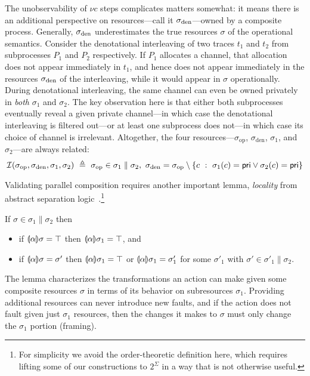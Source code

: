 \documentclass{entcs}
\begin{document}
The unobservability of $\nu c$ steps complicates matters somewhat: it
means there is an additional perspective on resources---call it
$\sigma_{\rm den}$---owned by a composite process.  Generally,
$\sigma_{\rm den}$ underestimates the true resources $\sigma$ of the
operational semantics.  Consider the denotational interleaving of two
traces $t_1$ and $t_2$ from subprocesses $P_1$ and $P_2$ respectively.
If $P_1$ allocates a channel, that allocation does not appear
immediately in $t_1$, and hence does not appear immediately in the
resources $\sigma_{\rm den}$ of the interleaving, while it would
appear in $\sigma$ operationally.  During denotational interleaving,
the same channel can even be owned privately in \emph{both} $\sigma_1$
and $\sigma_2$.  The key observation here is that either both
subprocesses eventually reveal a given private channel---in which case
the denotational interleaving is filtered out---or at least one
subprocess does not---in which case its choice of channel is
irrelevant.  Altogether, the four resources---$\sigma_{\textrm{op}}$,
$\sigma_{\textrm{den}}$, $\sigma_1$, and $\sigma_2$---are always
related: 
\[
\CI(\sigma_{\textrm{op}}, \sigma_{\textrm{den}}, \sigma_1, \sigma_2)\ \eqdef\ 
\sigma_{\textrm{op}} \in \sigma_1\parallel\sigma_2,\ 
\sigma_{\rm den} = \sigma_{\textrm{op}} \setminus \{ c\ :\ \sigma_1(c) = \pri \vee \sigma_2(c) = \pri \}
\]











Validating parallel composition requires another important lemma,
\emph{locality} from abstract separation
logic~\cite{Calcagno2007}.\footnote{ For simplicity we avoid the
  order-theoretic definition here, which requires lifting some of our
  constructions to $2^\Sigma$ in a way that is not otherwise useful.
}

\begin{lemma}[Locality]
  If $\sigma \in \sigma_1 \parallel \sigma_2$ then
\begin{itemize}
  \item if $\llparenthesis \alpha \rrparenthesis \sigma = \top$ then $\llparenthesis \alpha \rrparenthesis \sigma_1 = \top$, and
  \item if $\llparenthesis \alpha \rrparenthesis \sigma = \sigma'$ then
    $\llparenthesis \alpha \rrparenthesis \sigma_1 = \top$ or $\llparenthesis \alpha \rrparenthesis \sigma_1 =
    \sigma'_1$ for some $\sigma'_1$ with $\sigma' \in \sigma'_1
    \parallel \sigma_2$.
\end{itemize}
\end{lemma}
The lemma characterizes the transformations an action can make given
some composite resources $\sigma$ in terms of its behavior on
subresources $\sigma_1$.  Providing additional resources can never
introduce new faults, and if the action does not fault given just
$\sigma_1$ resources, then the changes it makes to $\sigma$ must only
change the $\sigma_1$ portion (framing).
\end{document}
